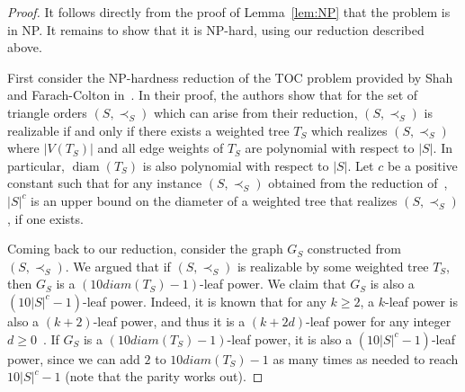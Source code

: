 \documentclass[11pt, letter]{article}
\theoremstyle{remark}
\DeclareMathOperator{\diam}{diam}
\begin{document}
\begin{proof}
    It follows directly from the proof of Lemma~\ref{lem:NP} that the problem is in NP. It remains to show that it is NP-hard, using our reduction described above.

    First consider the NP-hardness reduction of the TOC problem provided by Shah and Farach-Colton in~\cite{SF06}.
    In their proof, the authors show that for the set of triangle orders $(S,\prec_{S})$ which can arise from their reduction, $(S,\prec_{S})$ is realizable if and only if there exists a weighted tree $T_{S}$ which realizes $(S,\prec_{S})$ where $|V(T_S)|$ and all edge weights of $T_{S}$ are polynomial with respect to $|S|$. In particular, $\diam(T_{S})$ is also polynomial with respect to $|S|$.
    Let $c$ be a positive constant such that for any instance $(S, \prec_S)$ obtained from the reduction of~\cite{SF06},  $|S|^c$ is an upper bound on the diameter of a weighted tree that realizes $(S, \prec_S)$, if one exists.

    Coming back to our reduction, consider the graph $G_S$ constructed from $(S, \prec_S)$.  We argued that if $(S, \prec_S)$ is realizable by some weighted tree $T_S$, then $G_S$ is a $(10 diam(T_S) - 1)$-leaf power. 
    We claim that $G_S$ is also a $(10 |S|^c - 1)$-leaf power.
    Indeed, it is known that for any $k \geq 2$, a $k$-leaf power is also a $(k + 2)$-leaf power, and thus it is a $(k + 2d)$-leaf power for any integer $d \geq 0$~\cite{brandstadt2008k}. 
    If $G_S$ is a $(10 diam(T_S) - 1)$-leaf power, it is also a $(10 |S|^c - 1)$-leaf power, since we can add $2$ to $10 diam(T_S) - 1$ as many times as needed to reach $10 |S|^c - 1$ (note that the parity works out).


\end{proof}
\end{document}
